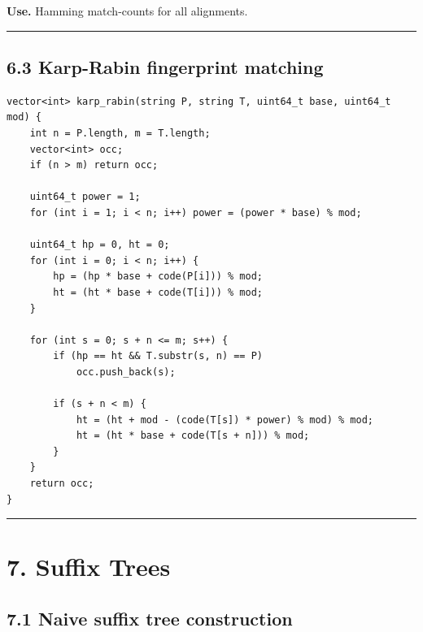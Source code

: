 \documentclass[11pt]{article}
\begin{document}
\textbf{Use.} Hamming match-counts for all alignments.

\begin{center}\rule{0.5\linewidth}{0.5pt}\end{center}

\subsection{6.3 Karp-Rabin fingerprint matching}\label{karp-rabin-fingerprint-matching}

\begin{verbatim}
vector<int> karp_rabin(string P, string T, uint64_t base, uint64_t mod) {
    int n = P.length, m = T.length;
    vector<int> occ;
    if (n > m) return occ;

    uint64_t power = 1;
    for (int i = 1; i < n; i++) power = (power * base) % mod;

    uint64_t hp = 0, ht = 0;
    for (int i = 0; i < n; i++) {
        hp = (hp * base + code(P[i])) % mod;
        ht = (ht * base + code(T[i])) % mod;
    }

    for (int s = 0; s + n <= m; s++) {
        if (hp == ht && T.substr(s, n) == P)
            occ.push_back(s);

        if (s + n < m) {
            ht = (ht + mod - (code(T[s]) * power) % mod) % mod;
            ht = (ht * base + code(T[s + n])) % mod;
        }
    }
    return occ;
}
\end{verbatim}

\begin{center}\rule{0.5\linewidth}{0.5pt}\end{center}

\section{7. Suffix Trees}\label{suffix-trees}

\subsection{7.1 Naive suffix tree construction}\label{naive-suffix-tree-construction}
\end{document}

